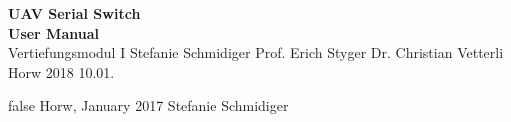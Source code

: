 \documentclass[a4paper,fleqn,english]{book}
\begin{document}
\lsstyle                               %
\fontsize{10.5}{13.7}\selectfont       %



\prestuffmastershort                                 %
{                                                    %
\huge\textbf{UAV Serial Switch\\User Manual}\\     			     %
}
{Vertiefungsmodul I}                         	       %
{Stefanie Schmidiger}          	      		 			%
{Prof. Erich Styger}                          	       		%
{Dr. Christian Vetterli}                                   		%
{Horw}                                          		 	%
{2018}                                         		 		%
{10.01.}                                       		 		%




\vorwort%
{false} %
{} %
{Horw, January 2017} %
{Stefanie Schmidiger} %
\end{document}
